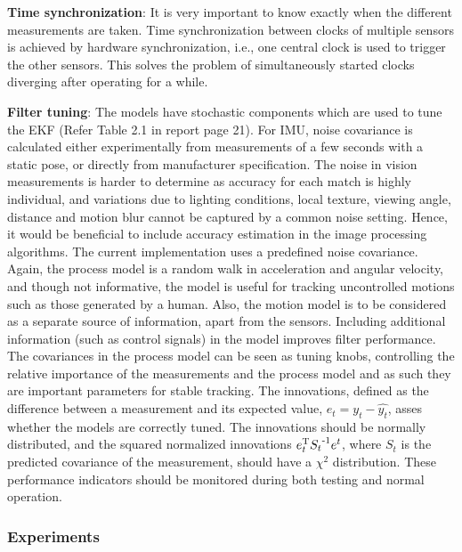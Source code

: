 \textbf{Time synchronization}: It is very important to know exactly when the different measurements are taken. Time synchronization between clocks of multiple sensors is achieved by hardware synchronization, i.e., one central clock is used to trigger the other sensors. This solves the problem of simultaneously started clocks diverging after operating for a while. 

\textbf{Filter tuning}: The models have stochastic components which are used to tune the EKF (Refer Table 2.1 in report page 21). For IMU, noise covariance is calculated either experimentally from measurements of a few seconds with a static pose, or directly from manufacturer specification. The noise in vision measurements is harder to determine as accuracy for each match is highly individual, and variations due to lighting conditions, local texture, viewing angle, distance and motion blur cannot be captured by a common noise setting. Hence, it would be beneficial to include accuracy estimation in the image processing algorithms. 
The current implementation uses a predefined noise covariance. Again, the process model is a random walk in acceleration and angular velocity, and though not informative, the model is useful for tracking uncontrolled motions such as those generated by a human. Also, the motion model is to be considered as a separate source of information, apart from the sensors. Including additional information (such as control signals) in the model improves filter performance. The covariances in the process model can be seen as tuning knobs, controlling the relative importance of the measurements and the process model and as such they are important parameters for stable tracking. The innovations, defined as the difference between a measurement and its expected value, $ e_{t} = y_{t} - \hat{y_{t}} $, asses whether the models are correctly tuned. The innovations should be normally distributed, and the squared normalized innovations $ e_{t}\tpose {S_{t}}\tpose[-1] e^{t} $, where $ S_{t} $ is the predicted covariance of the measurement, should have a $ \chi^{2} $ distribution. These performance indicators should be monitored during both testing and normal operation.

\subsubsection{Experiments}

